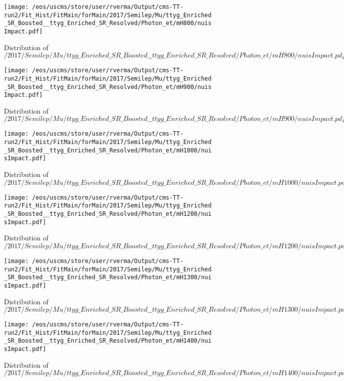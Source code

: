 \begin{figure}
\centering
\texttt{[image: /eos/uscms/store/user/rverma/Output/cms-TT-run2/Fit\_Hist/FitMain/forMain/2017/Semilep/Mu/ttyg\_Enriched\_SR\_Boosted\_\_ttyg\_Enriched\_SR\_Resolved/Photon\_et/mH800/nuisImpact.pdf]}
\caption{Distribution of $/2017/Semilep/Mu/ttyg\_Enriched\_SR\_Boosted\_\_ttyg\_Enriched\_SR\_Resolved/Photon\_et/mH800/nuisImpact.pdf$}
\end{figure}

\begin{figure}
\centering
\texttt{[image: /eos/uscms/store/user/rverma/Output/cms-TT-run2/Fit\_Hist/FitMain/forMain/2017/Semilep/Mu/ttyg\_Enriched\_SR\_Boosted\_\_ttyg\_Enriched\_SR\_Resolved/Photon\_et/mH900/nuisImpact.pdf]}
\caption{Distribution of $/2017/Semilep/Mu/ttyg\_Enriched\_SR\_Boosted\_\_ttyg\_Enriched\_SR\_Resolved/Photon\_et/mH900/nuisImpact.pdf$}
\end{figure}

\begin{figure}
\centering
\texttt{[image: /eos/uscms/store/user/rverma/Output/cms-TT-run2/Fit\_Hist/FitMain/forMain/2017/Semilep/Mu/ttyg\_Enriched\_SR\_Boosted\_\_ttyg\_Enriched\_SR\_Resolved/Photon\_et/mH1000/nuisImpact.pdf]}
\caption{Distribution of $/2017/Semilep/Mu/ttyg\_Enriched\_SR\_Boosted\_\_ttyg\_Enriched\_SR\_Resolved/Photon\_et/mH1000/nuisImpact.pdf$}
\end{figure}

\begin{figure}
\centering
\texttt{[image: /eos/uscms/store/user/rverma/Output/cms-TT-run2/Fit\_Hist/FitMain/forMain/2017/Semilep/Mu/ttyg\_Enriched\_SR\_Boosted\_\_ttyg\_Enriched\_SR\_Resolved/Photon\_et/mH1200/nuisImpact.pdf]}
\caption{Distribution of $/2017/Semilep/Mu/ttyg\_Enriched\_SR\_Boosted\_\_ttyg\_Enriched\_SR\_Resolved/Photon\_et/mH1200/nuisImpact.pdf$}
\end{figure}

\begin{figure}
\centering
\texttt{[image: /eos/uscms/store/user/rverma/Output/cms-TT-run2/Fit\_Hist/FitMain/forMain/2017/Semilep/Mu/ttyg\_Enriched\_SR\_Boosted\_\_ttyg\_Enriched\_SR\_Resolved/Photon\_et/mH1300/nuisImpact.pdf]}
\caption{Distribution of $/2017/Semilep/Mu/ttyg\_Enriched\_SR\_Boosted\_\_ttyg\_Enriched\_SR\_Resolved/Photon\_et/mH1300/nuisImpact.pdf$}
\end{figure}

\begin{figure}
\centering
\texttt{[image: /eos/uscms/store/user/rverma/Output/cms-TT-run2/Fit\_Hist/FitMain/forMain/2017/Semilep/Mu/ttyg\_Enriched\_SR\_Boosted\_\_ttyg\_Enriched\_SR\_Resolved/Photon\_et/mH1400/nuisImpact.pdf]}
\caption{Distribution of $/2017/Semilep/Mu/ttyg\_Enriched\_SR\_Boosted\_\_ttyg\_Enriched\_SR\_Resolved/Photon\_et/mH1400/nuisImpact.pdf$}
\end{figure}

